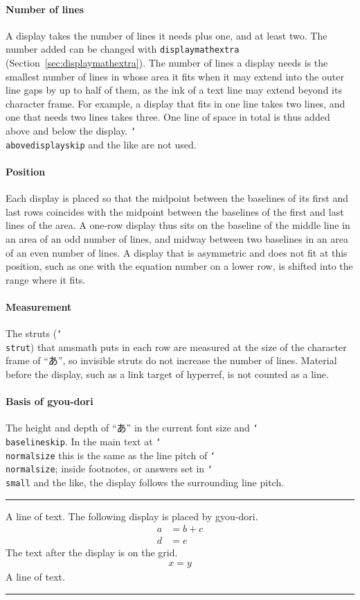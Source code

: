 \documentclass[paper=a4,dvipdfmx]{jlreq}
\newcommand\pkg[1]{\textsf{#1}}
\newcommand\opt[1]{\texttt{#1}}
\newcommand\cs[1]{\texttt{\char`\\#1}}
\newenvironment{demo}
  {\par\medskip\noindent
   \begin{minipage}{\linewidth}\hrule\smallskip}
  {\par\smallskip\hrule\end{minipage}\par\medskip}
\begin{document}
\paragraph{Number of lines}
A display takes the number of lines it needs plus one, and at least two. The
number added can be changed with \opt{displaymathextra}
(Section~\ref{sec:displaymathextra}). The number of lines a display needs is the
smallest number of lines in whose area it fits when it may extend into the outer
line gaps by up to half of them, as the ink of a text line may extend beyond its
character frame. For example, a display that fits in one line takes two lines,
and one that needs two lines takes three. One line of space in total is thus
added above and below the display. \cs{abovedisplayskip} and the like are not
used.

\paragraph{Position}
Each display is placed so that the midpoint between the baselines of its first
and last rows coincides with the midpoint between the baselines of the first and
last lines of the area. A one-row display thus sits on the baseline of the middle
line in an area of an odd number of lines, and midway between two baselines in
an area of an even number of lines. A display that is asymmetric and does not fit
at this position, such as one with the equation number on a lower row, is
shifted into the range where it fits.

\paragraph{Measurement}
The struts (\cs{strut}) that \pkg{amsmath} puts in each row are measured at the
size of the character frame of ``あ'', so invisible struts do not increase the
number of lines. Material before the display, such as a link target of hyperref,
is not counted as a line.

\paragraph{Basis of gyou-dori}
The height and depth of ``あ'' in the current font size and \cs{baselineskip}.
In the main text at \cs{normalsize} this is the same as the line pitch of
\cs{normalsize}; inside footnotes, or answers set in \cs{small} and the like,
the display follows the surrounding line pitch.

\begin{demo}
A line of text. The following display is placed by gyou-dori.
\begin{align}
  a &= b + c \\
  d &= e
\end{align}
The text after the display is on the grid.
\begin{gather*}
  x = y
\end{gather*}
A line of text.
\end{demo}
\end{document}
